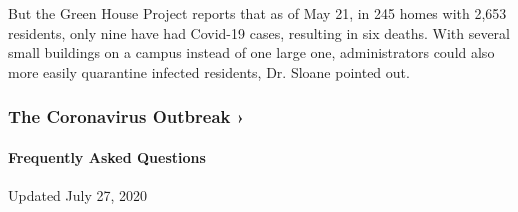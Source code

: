 But the Green House Project reports that as of May 21, in 245 homes with
2,653 residents, only nine have had Covid-19 cases, resulting in six
deaths. With several small buildings on a campus instead of one large
one, administrators could also more easily quarantine infected
residents, Dr. Sloane pointed out.

\href{https://www.nytimes3xbfgragh.onion/news-event/coronavirus?action=click\&pgtype=Article\&state=default\&region=MAIN_CONTENT_3\&context=storylines_faq}{}

\hypertarget{the-coronavirus-outbreak-}{%
\subsubsection{The Coronavirus Outbreak
›}\label{the-coronavirus-outbreak-}}

\hypertarget{frequently-asked-questions}{%
\paragraph{Frequently Asked
Questions}\label{frequently-asked-questions}}

Updated July 27, 2020

